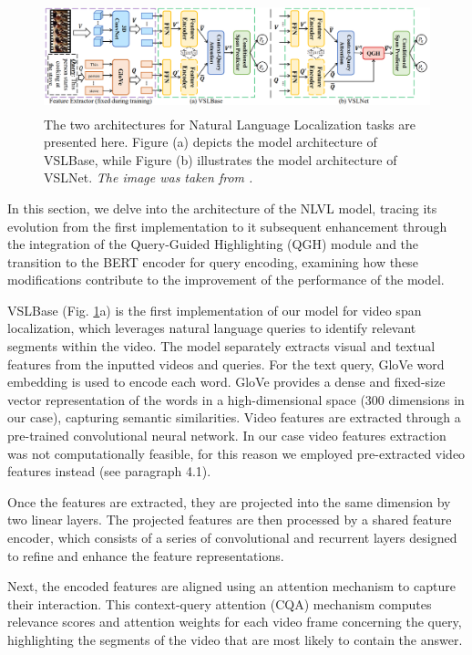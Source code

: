 \documentclass[10pt,twocolumn,letterpaper]{article}
\begin{document}
\begin{figure}
  \includegraphics[width=\textwidth,height=3.2cm]{VSLnet.png}
  \caption{The two architectures for Natural Language Localization tasks are presented here. Figure (a) depicts the model architecture of VSLBase, while Figure (b) illustrates the model architecture of VSLNet. \textit{The image was taken from \cite{b3}.}}
  \label{fig:VSL}
\end{figure}

In this section, we delve into the architecture of the NLVL model, tracing its evolution from the first implementation to it subsequent enhancement through the integration of the Query-Guided Highlighting (QGH) module and the transition to the BERT encoder for query encoding, examining how these modifications contribute to the improvement of the performance of the model.

VSLBase (Fig. \ref{fig:VSL}a) is the first implementation of our model for video span localization, which leverages natural language queries to identify relevant segments within the video.  The model separately extracts visual and textual features from the inputted videos and queries. For the text query, GloVe word embedding is used to encode each word. GloVe provides a dense and fixed-size vector representation of the words in a high-dimensional space (300 dimensions in our case), capturing semantic similarities. Video features are extracted through a pre-trained convolutional neural network. In our case video features extraction was not computationally feasible, for this reason we employed pre-extracted video features instead (see paragraph 4.1). 

Once the features are extracted, they are projected into the same dimension by two linear layers. The projected features are then processed by a shared feature encoder, which consists of a series of convolutional and recurrent layers designed to refine and enhance the feature representations.

Next, the encoded features are aligned using an attention mechanism to capture their interaction. This context-query attention (CQA) mechanism computes relevance scores and attention weights for each video frame concerning the query, highlighting the segments of the video that are most likely to contain the answer.
\end{document}
